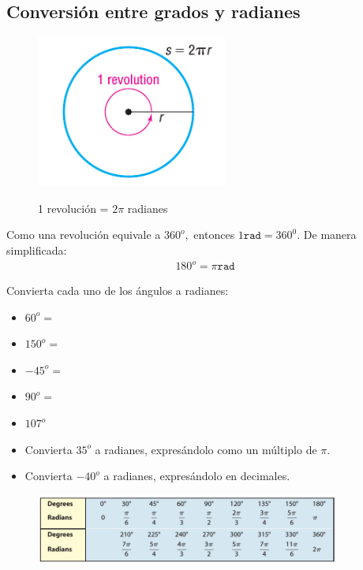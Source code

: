\subsection{Conversión entre grados y radianes}
{}
	\begin{figure}
		\centering
		\includegraphics[height=5cm,keepaspectratio=true]{./trig/sull6112.png}
		\label{fig:sull6112}
		\caption{1 revolución = $2\pi$ radianes}
	\end{figure}
	

{}
	Como una revolución equivale a $360^{o},$ entonces $1 \texttt{rad}=360^{0}.$ De manera simplificada:
	\begin{align*}
		180^{o}= \pi\texttt{rad}
	\end{align*}

{}
	\begin{problema}
		Convierta cada uno de los ángulos a radianes:
		\begin{itemize}
			\item $60^{o}=$ 
			\item $150^{o}=$ 
			\item $-45^{o}=$ 
			\item $90^{o}=$ 
			\item $107^{o}$ 
		\end{itemize}
		
	\end{problema}
	

{}
	\begin{problema}
		\begin{itemize}
			\item Convierta $35^{o}$ a radianes, expresándolo como un múltiplo de $\pi$.
			\item Convierta $-40^{o}$ a radianes, expresándolo en decimales. 
		\end{itemize}
		
	\end{problema}
	

{}
	\begin{figure}
		\centering
		\includegraphics[width=10cm,keepaspectratio=true]{./trig/sull61t1.png}
		\label{fig:61t1}
	\end{figure}
	

